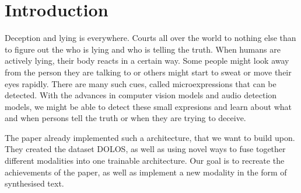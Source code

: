 \section{Introduction}
\label{sec:Introduction}

Deception and lying is everywhere. Courts all over the world to nothing else than to figure out the who is lying and who is telling the truth. 
When humans are actively lying, their body reacts in a certain way. Some people might look away from the person they are talking to or 
others might start to sweat or move their eyes rapidly. There are many such cues, called microexpressions that can be detected.
With the advances in computer vision models and audio detection models, we might be able to detect these small expresions and learn
about what and when persons tell the truth or when they are trying to deceive. 

The paper \cite{guo2023audio} already implemented such a architecture, that we want to build upon. They created the dataset DOLOS, as well as
using novel ways to fuse together different modalities into one trainable architecture. Our goal is to recreate the achievements of the paper,
as well as implement a new modality in the form of synthesised text. 